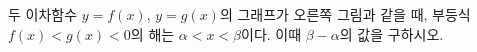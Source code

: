\noindent\begin{minipage}[t]{0.58\linewidth}\vspace{0pt}\raggedright 두 이차함수 $y=f(x)$, $y=g(x)$의 그래프가 오른쪽 그림과 같을 때, 부등식 $f(x)<g(x)<0$의 해는 $\alpha<x<\beta$이다. 이때 $\beta-\alpha$의 값을 구하시오.\end{minipage}\hfill\begin{minipage}[t]{0.4\linewidth}\vspace{0pt}\centering \resizebox{\ifdim\width>\linewidth\linewidth\else\width\fi}{!}{}\end{minipage}\par
